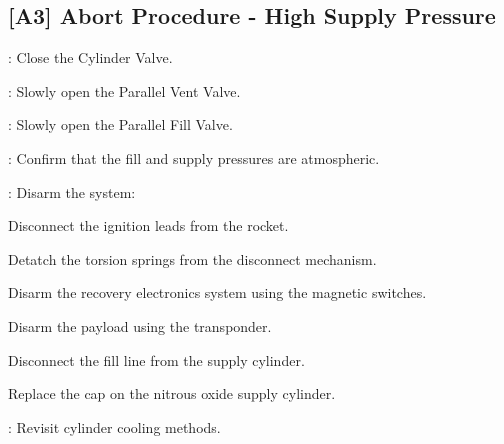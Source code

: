 \subsection{[A3] Abort Procedure - High Supply Pressure}
\begin{checklist}
    \item \primary{}: Close the Cylinder Valve.
    \item \primary{}: Slowly open the Parallel Vent Valve.
    \item \primary{}: Slowly open the Parallel Fill Valve.
    \item \control{}: Confirm that the fill and supply pressures are atmospheric.
    \item \primary{}: Disarm the system:
        \begin{checklist}    
            \item Disconnect the ignition leads from the rocket.
            \item Detatch the torsion springs from the disconnect mechanism.
            \item Disarm the recovery electronics system using the magnetic switches.
            \item Disarm the payload using the transponder.
            \item Disconnect the fill line from the supply cylinder.
            \item Replace the cap on the nitrous oxide supply cylinder.
        \end{checklist}
    \item \ops{}: Revisit cylinder cooling methods.
\end{checklist}
\setcounter{checklistnum}{0}

